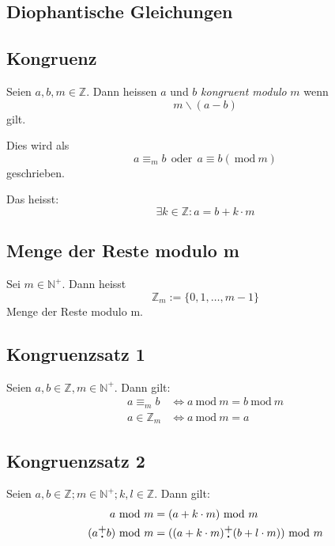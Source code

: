 \documentclass[a4paper, ngerman, landscape, fleqn]{article}
\newcommand{\Mod}{\ \mathrm{mod}\ }
\newcommand{\plusdot}{\stackanchor[1pt]{$+$}{$\boldsymbol{\cdot}$}}
\begin{document}
\begin{multicols*}{3}
\section*{Diophantische Gleichungen}
\subsection*{Kongruenz}
Seien $a, b, m \in \mathbb{Z}$. Dann heissen $a$ und $b$ \emph{kongruent modulo} $m$ wenn
\begin{equation*}
    m \backslash (a -b)
\end{equation*}
gilt.

Dies wird als 
\begin{equation*}
    a \equiv_m b \ \ \text{oder}\ \ a \equiv b (\Mod m)
\end{equation*}
geschrieben.

\vspace{1em}

Das heisst:
\begin{equation*}
    \exists k \in \mathbb{Z} : a = b + k \cdot m
\end{equation*}

\subsection*{Menge der Reste modulo m}

Sei $m \in \mathbb{N}^+$. Dann heisst
\begin{equation*}
    \mathbb{Z}_m := \{0,1,\dots, m - 1\}
\end{equation*}
Menge der Reste modulo m.

\subsection*{Kongruenzsatz 1}
Seien $a, b \in \mathbb{Z}, m \in \mathbb{N}^+$. Dann gilt:
\begin{align*}
    a \equiv_m b & \iff a \Mod m = b \Mod m \\
    a \in \mathbb{Z}_m & \iff a \Mod m = a
\end{align*}

\subsection*{Kongruenzsatz 2}
Seien $a, b \in \mathbb{Z}; m \in \mathbb{N}^+; k, l \in \mathbb{Z}$. Dann gilt:
\begin{align*}
    a \Mod m & = (a + k \cdot m) \Mod m \\
    (a \plusdot b) \Mod m &= ((a + k \cdot m) \plusdot (b + l \cdot m)) \Mod m
\end{align*}


\end{multicols*}
\end{document}
